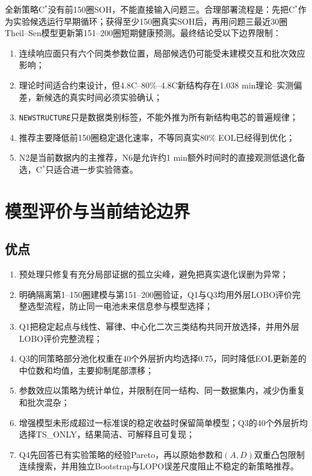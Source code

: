 \documentclass[withoutpreface]{cumcmthesis}
\begin{document}
全新策略C$^*$没有前150圈SOH，不能直接输入问题三。合理部署流程是：先把C$^*$作为实验候选运行早期循环；获得至少150圈真实SOH后，再用问题三最近30圈Theil--Sen模型更新第151--200圈短期健康预测。最终结论受以下边界限制：
\begin{enumerate}[label=\arabic*)]
  \item 连续响应面只有六个同类参数位置，局部候选仍可能受未建模交互和批次效应影响；
  \item 理论时间适合约束设计，但4.8C--80\%--4.8C新结构存在1.038 min理论--实测偏差，新候选的真实时间必须实验确认；
  \item \texttt{NEWSTRUCTURE}只是数据类别标签，不能外推为所有新结构电芯的普遍规律；
  \item 推荐主要降低前150圈稳定退化速率，不等同真实80\% EOL已经得到优化；
  \item N2是当前数据内的主推荐，N6是允许约1 min额外时间时的直接观测低退化备选，C$^*$只适合进一步实验筛查。
\end{enumerate}

\section{模型评价与当前结论边界}

\subsection{优点}

\begin{enumerate}[label=\arabic*)]
  \item 预处理只修复有充分局部证据的孤立尖峰，避免把真实退化误删为异常；
  \item 明确隔离第1--150圈建模与第151--200圈验证，Q1与Q3均用外层LOBO评价完整选型流程，防止同一电池未来信息参与模型选择；
  \item Q1把稳定起点与线性、幂律、中心化二次三类结构共同开放选择，并用外层LOBO评价完整流程；
  \item Q3的同策略部分池化权重在40个外层折内均选择0.75，同时降低EOL更新差的中位数和均值，主要抑制尾部漂移；
  \item 参数效应以策略为统计单位，并限制在同一结构、同一数据集内，减少伪重复和批次混杂；
  \item 增强模型未形成超过一标准误的稳定收益时保留简单模型；Q3的40个外层折均选择TS\_ONLY，结果简洁、可解释且可复现；
  \item Q4先回答已有实验策略的经验Pareto，再以原始参数和$(A,D)$双重凸包限制连续搜索，并用独立Bootstrap与LOPO误差尺度阻止不稳定的新策略推荐。
\end{enumerate}
\end{document}
